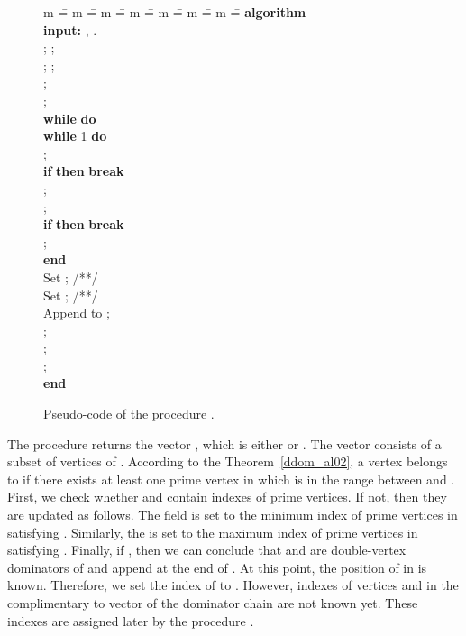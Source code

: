 \documentclass{llncs}
\newcommand{\ALGORITHM}{\textbf{algorithm} }
\newcommand{\END}{\textbf{end} }
\newcommand{\DO}{\textbf{do} }
\newcommand{\IF}{\textbf{if} }
\newcommand{\THEN}{\textbf{then} }
\newcommand{\WHILE}{\textbf{while} }
\newcommand{\BREAK}{\textbf{break} }
\newcommand{\INPUT}{\textbf{input:} }
\begin{document}
\begin{figure}[t!]
\begin{center}
\parbox{0cm} 
{
\begin{tabbing}
m \== m \== m \== m \== m \== m \== m \== \kill
\ALGORITHM  \\
\INPUT , . \\
\> ; ;\\
\> ; ;\\
\> ;\\
\> ;\\
\> \WHILE  \DO \\
\> \> \WHILE 1 \DO\\
\> \> \> ;\\
\> \> \> \IF  \THEN \BREAK \\
\> \> \> ;\\
\> \> \> ;\\
\> \> \> \IF  \THEN \BREAK \\
\> \> \> ;\\
\> \> \END \\
\> \> Set ; /**/\\
\> \> Set ; /**/\\
\> \> Append  to ;\\
\> \> ;\\
\> \> ;\\
\> \> ;\\
\> \END \\
\end{tabbing}
}
\caption{Pseudo-code of the procedure .}\label{ddom_code3b}
\end{center}
\end{figure}


The procedure  returns the vector
, which is either  or . 
The vector  consists
of a subset of vertices of . According to the Theorem~\ref{ddom_al02},
a vertex  belongs to 
 if there exists at least one prime vertex
in  which is in the range between  and
. First, we check whether  and 
contain indexes of prime vertices. If not, then they are updated as follows. The
field  is set to the minimum index of 
prime vertices  in  satisfying .
Similarly, the  is
set to the maximum index of 
prime vertices  in  satisfying .
Finally, if
, then we can conclude that   and
 are double-vertex
dominators of  and  append  at the end of . 
At this point,  the position of 
in  is known. Therefore, we set the index of  to .
However, indexes of vertices  
and  in the complimentary to  
vector of the dominator chain are not known yet. These indexes are assigned later by the
procedure .
\end{document}
